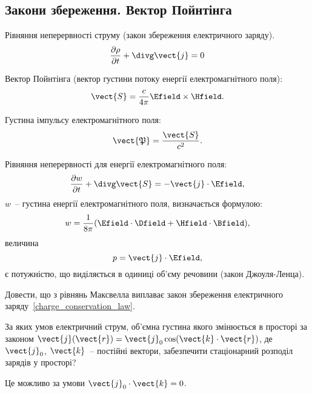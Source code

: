 \subsection*{Закони збереження. Вектор Пойнтінга}

\begin{Theory}
Рівняння неперервності струму (закон збереження електричного заряду).
	\begin{equation} \label{charge_conservation_law}
		\frac{\partial \rho}{\partial t} + \divg\vect{j} = 0
	\end{equation}

Вектор Пойнтінга (вектор густини потоку енергії електромагнітного поля):
	\begin{equation}
			\vect{S} = \frac{c}{4\pi} \Efield\times\Hfield.
	\end{equation}

Густина імпульсу електромагнітного поля:
\begin{equation}
	\vect{\mathfrak{P}} = \frac{\vect{S}}{c^2}.
\end{equation}

Рівняння неперервності для енергії електромагнітного поля:
	\begin{equation} 
		\frac{\partial w}{\partial t} + \divg\vect{S} = -  \vect{j}\cdot\Efield,
	\end{equation}
$ w $~-- густина енергії електромагнітного поля, визначається формулою:
	\begin{equation} 
		w = \frac{1}{8\pi} (\Efield\cdot\Dfield + \Hfield\cdot\Bfield),
	\end{equation}
величина
	\begin{equation} 
		p =\vect{j}\cdot\Efield ,
	\end{equation}
є потужністю, що виділяється в одиниці об'єму речовини (закон Джоуля-Ленца).
\end{Theory}


\begin{problem}
    Довести, що з рівнянь Максвелла виплаває закон збереження електричного заряду~\ref{charge_conservation_law}.
\end{problem}

\begin{problem}
За яких умов електричний струм, об'ємна густина якого змінюється в просторі за законом  $\vect{j}(\vect{r}) = \vect{j}_0\cos(\vect{k}\cdot\vect{r})$, де $\vect{j}_0$, $\vect{k}$~-- постійні вектори, забезпечити стаціонарний розподіл зарядів у просторі?
\begin{solution}
	Це можливо за умови $\vect{j}_0\cdot\vect{k} = 0$.
\end{solution}
\end{problem}

